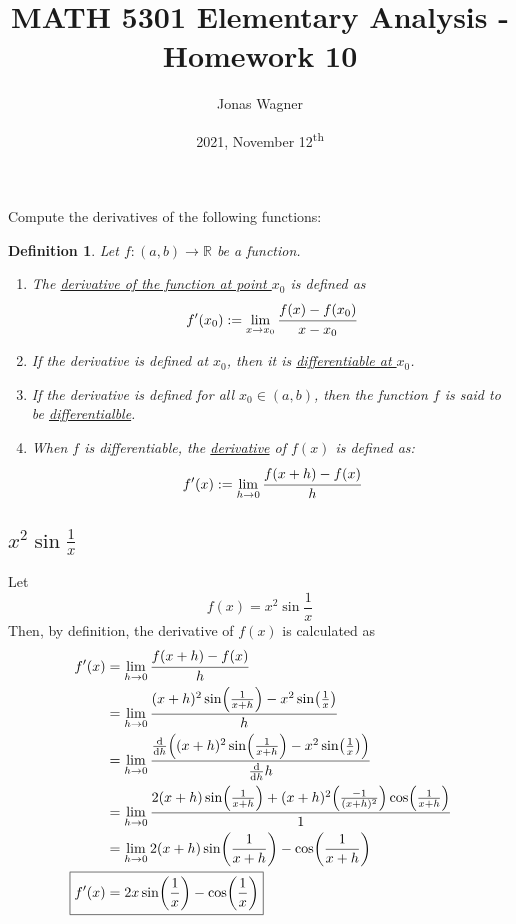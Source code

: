 \documentclass[]{article}
\title{MATH 5301 Elementary Analysis - Homework 10}
\author{Jonas Wagner}
\date{2021, November 12\textsuperscript{th}}
\newcommand{\R}{\mathbb{R}}
\newtheorem{definition}{Definition}
\begin{document}
\maketitle

\section{}
Compute the derivatives of the following functions:

\begin{definition}
    Let $f : (a,b) \to \R$ be a function.    
    \begin{enumerate}
        \item The \emph{\underline{derivative of the function at point $x_0$}} is defined as
        \[
            f'(x_0) := \lim_{x \to x_0} \cfrac{f(x) - f(x_0)}{x - x_0}
        \]
        \item If the derivative is defined at $x_0$, then it is \emph{\underline{differentiable at $x_0$}}.
        \item If the derivative is defined for all $x_0 \in (a,b)$, then the function $f$ is said to be \emph{\underline{differentialble}}.
        \item When $f$ is differentiable, the \underline{\emph{derivative}} of $f(x)$ is defined as:
        \[
            f'(x) := \lim_{h \to 0} \cfrac{f(x + h) - f(x)}{h}
        \]
    \end{enumerate}
\end{definition}

\subsection{
    $x^2 \sin{\frac{1}{x}}$
}
Let
\[
    f(x) = x^2 \sin{\frac{1}{x}}
\]
Then, by definition, the derivative of $f(x)$ is calculated as
\begin{align*}
    f'(x) 
    &= \lim_{h \to 0} \cfrac{f(x + h) - f(x)}{h}\\
    &= \lim_{h \to 0} 
        \cfrac{
            (x + h)^2 \sin(\frac{1}{x + h}) - x^2 \sin(\frac{1}{x})
            }{h}\\
    &= \lim_{h \to 0} 
        \cfrac{
            \dv{h}\qty((x + h)^2 \sin(\frac{1}{x + h}) - x^2 \sin(\frac{1}{x}))
            }{
                \dv{h} h
            }\\
    &= \lim_{h \to 0} 
        \cfrac{
            2 (x + h) \sin(\frac{1}{x + h}) + (x + h)^2 \qty(\frac{-1}{(x+h)^2}) \cos(\frac{1}{x + h})
            }{1}\\
    &= \lim_{h \to 0} 2 (x + h) \sin(\frac{1}{x + h}) - \cos(\frac{1}{x + h})\\
    \Aboxed{
        f'(x)
        &= 2 x \sin(\frac{1}{x}) - \cos(\frac{1}{x})
        }
\end{align*}
\end{document}
